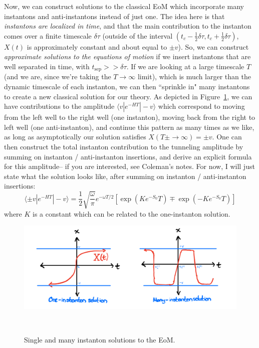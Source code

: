 \documentclass[11pt, oneside]{article}   	%
\theoremstyle{definition}
\begin{document}
Now, we can construct solutions to the classical EoM which incorporate many instantons and anti-instantons instead of just one. 
The idea here is that \textit{instantons are localized in time}, and that the main contribution to the instanton comes over a finite timescale 
$\delta\tau$ (outside of the interval $(t_c - \frac{1}{2}\delta\tau, t_c + \frac{1}{2}\delta\tau)$, $X(t)$ is approximately constant and about 
equal to $\pm v$). So, we can construct \textit{approximate solutions to the equations of motion} if we insert instantons that are well 
separated in time, with $t_\mathrm{sep} >> \delta\tau$. If we are looking at a large timescale $T$ (and we are, since we're taking the 
$T\rightarrow\infty$ limit), which is much larger than the dynamic timescale of each instanton, we can then ``sprinkle in" many instantons to 
create a new classical solution for our theory. As depicted in Figure~\ref{fig:many_instantons}, we can have contributions to the amplitude 
$\langle v | e^{-HT} | -v\rangle$ which correspond to moving from the left well to the right well (one instanton), moving back from the right to 
left well (one anti-instanton), and continue this pattern as many times as we like, as long as asymptotically our solution satisfies 
$X(T\pm\rightarrow\infty) = \pm v$. One can then construct the total instanton contribution to the tunneling amplitude by summing on 
instanton / anti-instanton insertions, and derive an explicit formula for this amplitude-- if you are interested, see Coleman's notes. For now, 
I will just state what the solution looks like, after summing on instanton / anti-instanton insertions:
\begin{equation}
	\langle\pm v | e^{-HT} | -v\rangle  = \frac{1}{2}\sqrt{\frac{\omega}{\pi}} e^{-\omega T / 2} \left[\exp\left( K e^{-S_0} T \right) \mp \exp\left( -K e^{-S_0} T \right)\right]
\end{equation}
where $K$ is a constant which can be related to the one-instanton solution. 

\begin{figure}[H]
	\centering
	\includegraphics[width = .9\textwidth]{many_instanton_soln}
	\caption{Single and many instanton solutions to the EoM. }~
	\label{fig:many_instantons}
\end{figure}
\end{document}
